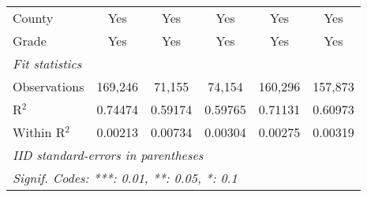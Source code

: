 \begin{table}[htbp]
\begin{tabular}{lccccc}
      County               & Yes                    & Yes             & Yes             & Yes                    & Yes\\
      Grade                & Yes                    & Yes             & Yes             & Yes                    & Yes\\
      \midrule \emph{Fit statistics} &   &   &   &   &  \\
      Observations         & 169,246                & 71,155          & 74,154          & 160,296                & 157,873\\
      R$^2$                & 0.74474                & 0.59174         & 0.59765         & 0.71131                & 0.60973\\
      Within R$^2$         & 0.00213                & 0.00734         & 0.00304         & 0.00275                & 0.00319\\
      \midrule\midrule\multicolumn{6}{l}{\emph{IID standard-errors in parentheses}}\\
      \multicolumn{6}{l}{\emph{Signif. Codes: ***: 0.01, **: 0.05, *: 0.1}}\\
   \end{tabular}
\end{table}


